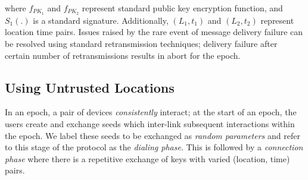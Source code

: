 \documentclass[letterpaper,twocolumn]{sig-alternate}
\begin{document}
where $f_{PK_1}$ and $f_{PK_2}$ represent standard public key encryption function, and $S_1(.)$ is a standard signature. Additionally, $(L_1,t_1)$ and $(L_2,t_2)$ represent location time pairs. Issues raised by the rare event of message delivery failure can be resolved using standard retransmission techniques; delivery failure after certain number of retransmissions results in abort for the epoch.

\subsection{Using Untrusted Locations}
\label{dp}

In an epoch, a pair of devices {\em consistently} interact; at the start of an epoch, the users create and exchange seeds which inter-link subsequent interactions within the epoch. We label these seeds to be exchanged as {\em random parameters} and refer to this stage of the protocol as the {\em dialing phase}. This is followed by a {\em connection phase} where there is a repetitive exchange of keys with varied (location, time) pairs.
\end{document}
